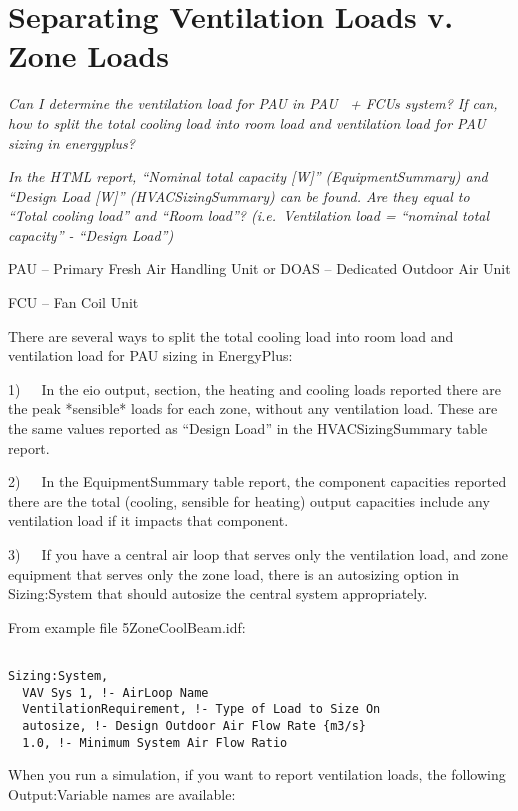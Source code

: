 \section{Separating Ventilation Loads v. Zone Loads}\label{separating-ventilation-loads-v.-zone-loads}

\emph{Can I determine the ventilation load for PAU in PAU~ + FCUs system? If can, how to split the total cooling load into room load and ventilation load for PAU sizing in energyplus?}

\emph{In the HTML report, ``Nominal total capacity {[}W{]}'' (EquipmentSummary) and ``Design Load {[}W{]}'' (HVACSizingSummary) can be found. Are they equal to ``Total cooling load'' and ``Room load''? (i.e.~Ventilation load = ``nominal total capacity'' - ``Design Load'')}

PAU -- Primary Fresh Air Handling Unit or DOAS -- Dedicated Outdoor Air Unit

FCU -- Fan Coil Unit

There are several ways to split the total cooling load into room load and ventilation load for PAU sizing in EnergyPlus:

1)~~~In the eio output, section, the heating and cooling loads reported there are the peak *sensible* loads for each zone, without any ventilation load. These are the same values reported as ``Design Load'' in the HVACSizingSummary table report.

2)~~~In the EquipmentSummary table report, the component capacities reported there are the total (cooling, sensible for heating) output capacities include any ventilation load if it impacts that component.

3)~~~If you have a central air loop that serves only the ventilation load, and zone equipment that serves only the zone load, there is an autosizing option in Sizing:System that should autosize the central system appropriately.

From example file 5ZoneCoolBeam.idf:

\begin{lstlisting}

Sizing:System,
  VAV Sys 1, !- AirLoop Name
  VentilationRequirement, !- Type of Load to Size On
  autosize, !- Design Outdoor Air Flow Rate {m3/s}
  1.0, !- Minimum System Air Flow Ratio
\end{lstlisting}

When you run a simulation, if you want to report ventilation loads, the following Output:Variable names are available:

